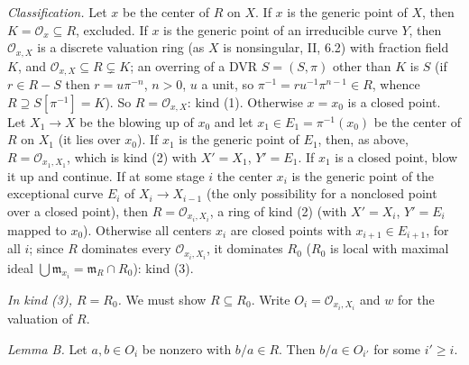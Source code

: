 \documentclass[11pt]{article}
\begin{document}
\emph{Classification.} Let $x$ be the center of $R$ on $X$. If $x$ is the generic point of $X$, then $K=\mathcal O_{x}\subseteq R$, excluded. If $x$ is the generic point of an irreducible curve $Y$, then $\mathcal O_{x,X}$ is a discrete valuation ring (as $X$ is nonsingular, II, 6.2) with fraction field $K$, and $\mathcal O_{x,X}\subseteq R\subsetneq K$; an overring of a DVR $S=(S,\pi)$ other than $K$ is $S$ (if $r\in R-S$ then $r=u\pi^{-n}$, $n>0$, $u$ a unit, so $\pi^{-1}=r u^{-1}\pi^{n-1}\in R$, whence $R\supseteq S[\pi^{-1}]=K$). So $R=\mathcal O_{x,X}$: kind (1). Otherwise $x=x_0$ is a closed point. Let $X_1\to X$ be the blowing up of $x_0$ and let $x_1\in E_1=\pi^{-1}(x_0)$ be the center of $R$ on $X_1$ (it lies over $x_0$). If $x_1$ is the generic point of $E_1$, then, as above, $R=\mathcal O_{x_1,X_1}$, which is kind (2) with $X'=X_1$, $Y'=E_1$. If $x_1$ is a closed point, blow it up and continue. If at some stage $i$ the center $x_i$ is the generic point of the exceptional curve $E_i$ of $X_i\to X_{i-1}$ (the only possibility for a nonclosed point over a closed point), then $R=\mathcal O_{x_i,X_i}$, a ring of kind (2) (with $X'=X_i$, $Y'=E_i$ mapped to $x_0$). Otherwise all centers $x_i$ are closed points with $x_{i+1}\in E_{i+1}$, for all $i$; since $R$ dominates every $\mathcal O_{x_i,X_i}$, it dominates $R_0$ ($R_0$ is local with maximal ideal $\bigcup\mathfrak m_{x_i}=\mathfrak m_R\cap R_0$): kind (3).

\emph{In kind (3), $R=R_0$.} We must show $R\subseteq R_0$. Write $O_i=\mathcal O_{x_i,X_i}$ and $w$ for the valuation of $R$.

\emph{Lemma B.} Let $a,b\in O_i$ be nonzero with $b/a\in R$. Then $b/a\in O_{i'}$ for some $i'\ge i$.
\end{document}
